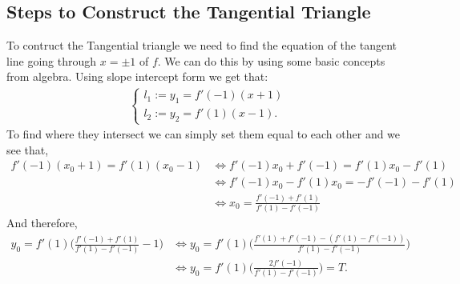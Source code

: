 \documentclass[12pt]{extreport}
\begin{document}
\subsection*{Steps to Construct the Tangential Triangle}
To contruct the Tangential triangle we need to find the equation of the tangent line going through $x = \pm 1$ of $f$. We can do this by using some basic concepts from algebra. Using slope intercept form we get that:
\begin{align*}
\left\{ \begin{array}{lr} l_1 := y_1 = f'(-1)(x+1) \\ l_2 := y_2 = f'(1)(x-1).\end{array} \right.
\end{align*}
To find where they intersect we can simply set them equal to each other and we see that,
\begin{align*}
f'(-1)(x_0+1) = f'(1)(x_0-1) &\iff f'(-1)x_0 + f'(-1) = f'(1)x_0 - f'(1) \\&\iff f'(-1)x_0 - f'(1)x_0 = -f'(-1) - f'(1) \\&\iff x_0 = \frac{f'(-1)+ f'(1)}{f'(1) - f'(-1)} 
\end{align*}
And therefore,
\begin{align*}
y_0 = f'(1) \Big(\frac{f'(-1)+ f'(1)}{f'(1) - f'(-1)} - 1\Big) &\iff
y_0 = f'(1) \Big(\frac{f'(1) + f'(-1) - (f'(1) - f'(-1))}{f'(1)-f'(-1)}\Big) \\&\iff
y_0 = f'(1)\Big(\frac{2f'(-1)}{f'(1)-f'(-1)}\Big) =T.
\end{align*}
\end{document}
